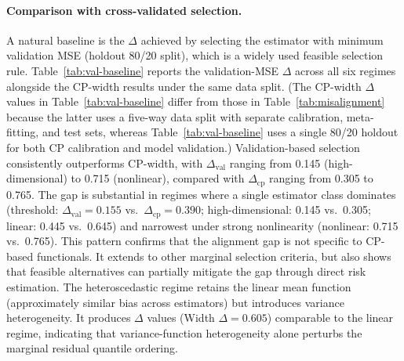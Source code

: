 \documentclass[pdflatex,sn-mathphys-ay]{sn-jnl}%
\theoremstyle{thmstyleone}%
\theoremstyle{thmstyletwo}%
\theoremstyle{thmstylethree}%
\begin{document}
\paragraph{Comparison with cross-validated selection.}
A natural baseline is the $\Delta$ achieved by selecting the estimator with minimum validation MSE (holdout 80/20 split), which is a widely used feasible selection rule. Table~\ref{tab:val-baseline} reports the validation-MSE $\Delta$ across all six regimes alongside the CP-width results under the same data split. (The CP-width $\Delta$ values in Table~\ref{tab:val-baseline} differ from those in Table~\ref{tab:misalignment} because the latter uses a five-way data split with separate calibration, meta-fitting, and test sets, whereas Table~\ref{tab:val-baseline} uses a single 80/20 holdout for both CP calibration and model validation.) Validation-based selection consistently outperforms CP-width, with $\Delta_{\text{val}}$ ranging from 0.145 (high-dimensional) to 0.715 (nonlinear), compared with $\Delta_{\text{cp}}$ ranging from 0.305 to 0.765. The gap is substantial in regimes where a single estimator class dominates (threshold: $\Delta_{\text{val}} = 0.155$ vs.\ $\Delta_{\text{cp}} = 0.390$; high-dimensional: 0.145 vs.\ 0.305; linear: 0.445 vs.\ 0.645) and narrowest under strong nonlinearity (nonlinear: 0.715 vs.\ 0.765). This pattern confirms that the alignment gap is not specific to CP-based functionals. It extends to other marginal selection criteria, but also shows that feasible alternatives can partially mitigate the gap through direct risk estimation. The heteroscedastic regime retains the linear mean function (approximately similar bias across estimators) but introduces variance heterogeneity. It produces $\Delta$ values (Width $\Delta = 0.605$) comparable to the linear regime, indicating that variance-function heterogeneity alone perturbs the marginal residual quantile ordering.
\end{document}
